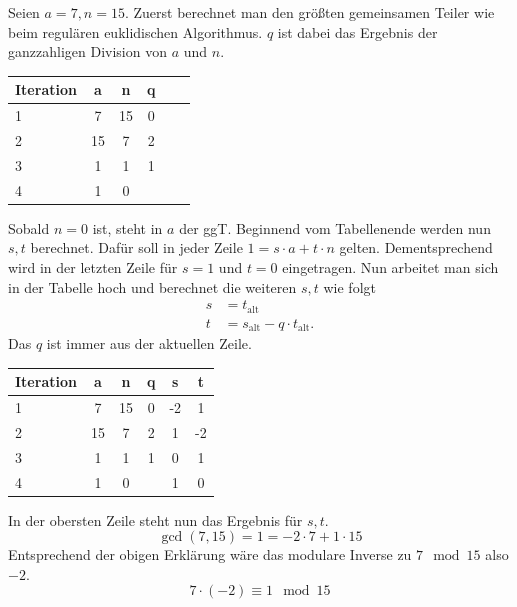 \begin{example}
    Seien $a = 7, n = 15$. Zuerst berechnet man den größten gemeinsamen Teiler
    wie beim regulären euklidischen Algorithmus.
    $q$ ist dabei das Ergebnis der ganzzahligen Division von $a$ und $n$.
    \begin{center}
        \begin{tabular}{|l|c|c|c|c|c|}
            \hline 
            Iteration & a & n & q\\
            \hline
            1 & 7 & 15 & 0 \\
            2 & 15 & 7 & 2 \\
            3 & 1 & 1 & 1 \\
            4 & 1 & 0 &\\
            \hline
        \end{tabular}
    \end{center}
    Sobald $n=0$ ist, steht in $a$ der ggT.
    Beginnend vom Tabellenende werden nun $s,t$ berechnet. Dafür soll in jeder Zeile $1 = s\cdot a + t\cdot n$ gelten.
    Dementsprechend wird in der letzten Zeile für $s = 1$ und $t=0$ eingetragen.
    Nun arbeitet man sich in der Tabelle hoch und berechnet die weiteren $s,t$ wie folgt
    \begin{align*}
        s &= t_{\text{alt}}\\
        t &= s_{\text{alt}} - q \cdot t_{\text{alt}}.
    \end{align*}
    Das $q$ ist immer aus der aktuellen Zeile.
    \begin{center}
        \begin{tabular}{|l|c|c|c|c|c|}
            \hline 
            Iteration & a & n & q & s & t\\
            \hline
            1 & 7 & 15 & 0 & -2 & 1\\
            2 & 15 & 7 & 2 & 1 & -2 \\
            3 & 1 & 1 & 1 & 0 & 1 \\
            4 & 1 & 0 & & 1 & 0\\
            \hline
        \end{tabular}
    \end{center}
    In der obersten Zeile steht nun das Ergebnis für $s,t$. 
    \[
        \gcd(7, 15) = 1 = -2\cdot 7 + 1\cdot 15
    \]
    Entsprechend der obigen Erklärung wäre das modulare Inverse zu $7\mod 15$ also $-2$.
    \[
        7\cdot (-2)\equiv 1 \mod 15
    \]
\end{example} 